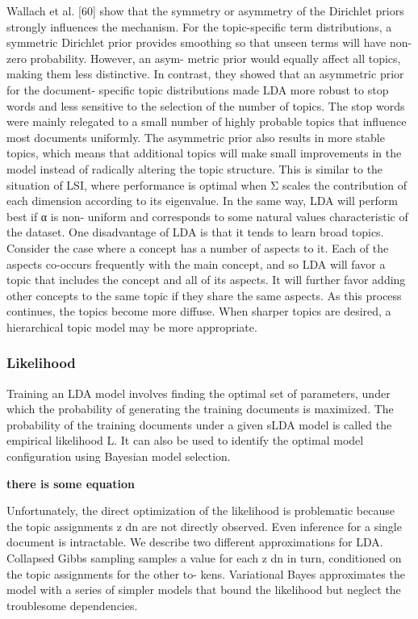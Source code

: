 Wallach et al. [60] show that the symmetry or asymmetry of the Dirichlet priors strongly influences the mechanism. For the topic-specific term distributions, a symmetric Dirichlet prior provides smoothing so that unseen terms will have non-zero probability. However, an asym- metric prior would equally affect all topics, making them less distinctive. In contrast, they showed that an asymmetric prior for the document- specific topic distributions made LDA more robust to stop words and less sensitive to the selection of the number of topics. The stop words were mainly relegated to a small number of highly probable topics that influence most documents uniformly. The asymmetric prior also results in more stable topics, which means that additional topics will make small improvements in the model instead of radically altering the topic structure. This is similar to the situation of LSI, where performance is optimal when Σ scales the contribution of each dimension according to its eigenvalue. In the same way, LDA will perform best if α is non- uniform and corresponds to some natural values characteristic of the dataset.
One disadvantage of LDA is that it tends to learn broad topics. Consider the case where a concept has a number of aspects to it. Each of the aspects co-occurs frequently with the main concept, and so LDA will favor a topic that includes the concept and all of its aspects. It will further favor adding other concepts to the same topic if they share the same aspects. As this process continues, the topics become more diffuse. When sharper topics are desired, a hierarchical topic model may be more appropriate.

\subsubsection{Likelihood} Training an LDA model involves finding the optimal set of parameters, under which the probability of generating the training documents is maximized. The probability of the training documents under a given sLDA model is called the empirical likelihood L. It can also be used to identify the optimal model configuration using Bayesian model selection.

\textbf{there is some equation}

Unfortunately, the direct optimization of the likelihood is problematic because the topic assignments z dn are not directly observed. Even inference for a single document is intractable. We describe two different approximations for LDA. Collapsed Gibbs sampling samples a value for each z dn in turn, conditioned on the topic assignments for the other to- kens. Variational Bayes approximates the model with a series of simpler models that bound the likelihood but neglect the troublesome dependencies.




